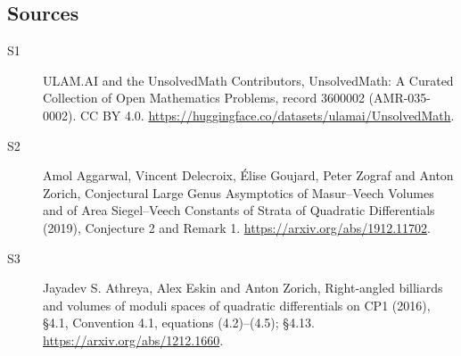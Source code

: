 \documentclass[11pt]{article}
\begin{document}
\subsection{Sources}
\begin{description}
\item[\hypertarget{source:3600002:1}{S1}] ULAM.AI and the UnsolvedMath Contributors, UnsolvedMath: A Curated Collection of Open Mathematics Problems, record 3600002 (AMR-035-0002). CC BY 4.0. \url{https://huggingface.co/datasets/ulamai/UnsolvedMath}.
\item[\hypertarget{source:3600002:2}{S2}] Amol Aggarwal, Vincent Delecroix, Élise Goujard, Peter Zograf and Anton Zorich, Conjectural Large Genus Asymptotics of Masur–Veech Volumes and of Area Siegel–Veech Constants of Strata of Quadratic Differentials (2019), Conjecture 2 and Remark 1. \url{https://arxiv.org/abs/1912.11702}.
\item[\hypertarget{source:3600002:3}{S3}] Jayadev S. Athreya, Alex Eskin and Anton Zorich, Right-angled billiards and volumes of moduli spaces of quadratic differentials on CP1 (2016), §4.1, Convention 4.1, equations (4.2)–(4.5); §4.13. \url{https://arxiv.org/abs/1212.1660}.
\end{description}
\label{end:3600002}
\end{document}
